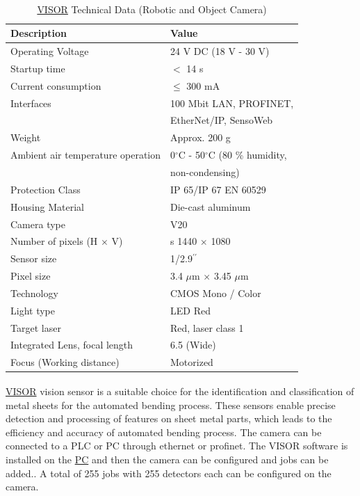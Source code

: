 \begin{table}[h!]
    \centering
    \small
    \renewcommand{\arraystretch}{1.2} %
    \begin{tabular}{ll}
        \textbf{Description} & \textbf{Value} \\ \hline
        Operating Voltage & 24 V DC (18 V - 30 V) \\
        Startup time & $<$ 14 s\\
        Current consumption & $\leq$ 300 mA \\
        Interfaces & 100 Mbit LAN, PROFINET,\\
        & EtherNet/IP, SensoWeb\\ 
        Weight & Approx. 200 g \\ 
        Ambient air temperature operation & 0$^\circ$C - 50$^\circ$C (80 \% humidity,\\
        & non-condensing) \\ 
        Protection Class & IP 65/IP 67 EN 60529\\
        Housing Material & Die-cast aluminum\\
        Camera type & V20 \\ 
        Number of pixels (H $\times$ V) &s 1440 $\times$ 1080\\
        Sensor size & 1/2.9$^{\prime\prime}$ \\ 
        Pixel size & 3.4 $\mu$m $\times$ 3.45 $\mu$m\\
        Technology & CMOS Mono / Color\\
        Light type & LED Red\\ 
        Target laser & Red, laser class 1\\ 
        Integrated Lens, focal length & 6.5 (Wide)\\
        Focus (Working distance) & Motorized \\ \hline
    \end{tabular}
    \caption{\hyperref[acro:VISOR]{VISOR}\textsuperscript{\textregistered} Technical Data (Robotic and Object Camera)}
    \label{visor-technical-data}
\end{table}

\hyperref[acro:VISOR]{VISOR}\textsuperscript{\textregistered} vision sensor is a suitable choice for the identification and classification of metal sheets for the automated bending process. These sensors enable precise detection and processing of features on sheet metal parts, which leads to the efficiency and accuracy of automated bending process. The camera can be connected to a PLC or PC through ethernet or profinet. The VISOR software is installed on the \hyperref[acro:PC]{PC} and then the camera can be configured and jobs can be added.\cite{sensopart-software}. A total of 255 jobs with 255 detectors each can be configured on the camera.

